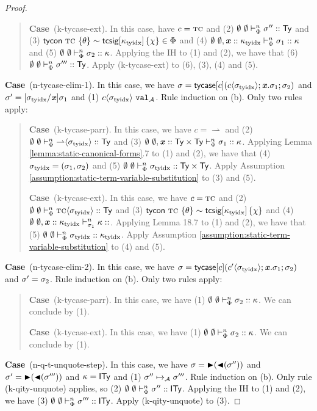 \documentclass[12pt]{article}
\newcommand{\pfcase}[1]{\textbf{Case}~#1. }
\begin{document}
\begin{proof}
\begin{quote}
    \pfcase{(k-tycase-ext)} In this case, have $c=\textsc{tc}$ and (2) $\emptyset~\emptyset \vdash_{\Phi}^{n} \sigma'' :: {\sf Ty}$ and (3) ${\sf tycon}~\textsc{tc} ~\{\theta\} \sim {\sf tcsig}[\kappa_\text{tyidx}]\,\{\chi\} \in \Phi$ and (4) $\emptyset~\emptyset, {\textbf{\textit{x}}} :: \kappa_\text{tyidx} \vdash_{\Phi}^{n} \sigma_1 :: \kappa$ and (5) $\emptyset~\emptyset \vdash_{\Phi}^{n} \sigma_2 :: \kappa$. Applying the IH to (1) and (2), we have that (6) $\emptyset~\emptyset \vdash_{\Phi}^{n} \sigma''' :: {\sf Ty}$. Apply (k-tycase-ext) to (6), (3), (4) and (5).
\end{quote}

\pfcase{(n-tycase-elim-1)} In this case, we have $\sigma={\sf tycase}[c]({c}\langle\sigma_\text{tyidx}\rangle; {\textbf{\textit{x}}}.\sigma_1; \sigma_2)$ and $\sigma'=[\sigma_\text{tyidx}/{\textbf{\textit{x}}}]\sigma_1$ and (1) ${c}\langle\sigma_\text{tyidx}\rangle~\mathtt{val}_{\mathcal{A}}$. Rule induction on (b). Only two rules apply:
\begin{quote}
    \pfcase{(k-tycase-parr)} In this case, we have $c={\rightharpoonup}$ and (2) $\emptyset~\emptyset \vdash_{\Phi}^{n} {\rightharpoonup}\langle\sigma_\text{tyidx}\rangle :: {\sf Ty}$ and (3) $\emptyset~\emptyset, {\textbf{\textit{x}}} :: {\sf Ty}\times{\sf Ty} \vdash_{\Phi}^{n} \sigma_1 :: \kappa$. Applying Lemma \ref{lemma:static-canonical-forms}.7 to (1) and (2), we have that (4) $\sigma_\text{tyidx}=(\sigma_1, \sigma_2)$ and (5) $\emptyset~\emptyset \vdash_{\Phi}^{n} \sigma_\text{tyidx} :: {\sf Ty}\times{\sf Ty}$. Apply Assumption \ref{assumption:static-term-variable-substitution} to (3) and (5). 

    \pfcase{(k-tycase-ext)} In this case, we have $c=\textsc{tc}$ and (2) $\emptyset~\emptyset \vdash_{\Phi}^{n} {\textsc{tc}}\langle\sigma_\text{tyidx}\rangle :: {\sf Ty}$ and (3) ${\sf tycon}~\textsc{tc} ~\{\theta\} \sim {\sf tcsig}[\kappa_\text{tyidx}]\,\{\chi\}$ and (4) $\sofk{\emptyset}{\emptyset, \sx :: \ktyidx}{\st_1}{\kappa}$. Applying Lemma 18.7 to (1) and (2), we have that (5) $\emptyset~\emptyset \vdash_{\Phi}^{n} \sigma_\text{tyidx} :: \kappa_\text{tyidx}$. Apply Assumption \ref{assumption:static-term-variable-substitution} to (4) and (5).
\end{quote}

\pfcase{(n-tycase-elim-2)} In this case, we have $\sigma={\sf tycase}[c]({c'}\langle\sigma_\text{tyidx}\rangle; {\textbf{\textit{x}}}.\sigma_1; \sigma_2)$ and $\sigma'=\sigma_2$. Rule induction on (b). Only two rules apply:
\begin{quote}
    \pfcase{(k-tycase-parr)} In this case, we have (1) $\emptyset~\emptyset \vdash_{\Phi}^{n} \sigma_2 :: \kappa$. We can conclude by (1).

    \pfcase{(k-tycase-ext)} In this case, we have (1) $\emptyset~\emptyset \vdash_{\Phi}^{n} \sigma_2 :: \kappa$. We can conclude by (1).
\end{quote}

\pfcase{(n-q-t-unquote-step)} In this case, we have $\sigma={\blacktriangleright}({\blacktriangleleft}(\sigma''))$ and $\sigma'={\blacktriangleright}({\blacktriangleleft}(\sigma'''))$ and $\kappa={\sf ITy}$ and (1) $\sigma'' \mapsto_{\mathcal{A}} \sigma'''$. Rule induction on (b). Only rule (k-qity-unquote) applies, so (2) $\emptyset~\emptyset \vdash_{\Phi}^{n} \sigma'' :: {\sf ITy}$. Applying the IH to (1) and (2), we have (3) $\emptyset~\emptyset \vdash_{\Phi}^{n} \sigma''' :: {\sf ITy}$. Apply (k-qity-unquote) to (3).


\end{proof}
\end{document}
